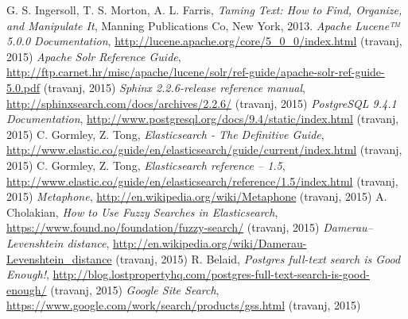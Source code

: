 \documentclass[a4paper,twoside,12pt]{scrreprt}
\begin{document}
\begin{thebibliography}{99}
   G. S. Ingersoll, T. S. Morton, A. L. Farris, \textit{Taming Text: How to Find, Organize, and Manipulate It}, Manning Publications Co, New York, 2013.
   \textit{Apache Lucene™ 5.0.0 Documentation}, \url{http://lucene.apache.org/core/5_0_0/index.html} (travanj, 2015)
   \textit{Apache Solr Reference Guide}, \url{http://ftp.carnet.hr/misc/apache/lucene/solr/ref-guide/apache-solr-ref-guide-5.0.pdf} (travanj, 2015)
   \textit{Sphinx 2.2.6-release reference manual}, \url{http://sphinxsearch.com/docs/archives/2.2.6/} (travanj, 2015)
   \textit{PostgreSQL 9.4.1 Documentation}, \url{http://www.postgresql.org/docs/9.4/static/index.html} (travanj, 2015)
   C. Gormley, Z. Tong, \textit{Elasticsearch - The Definitive Guide}, \url{http://www.elastic.co/guide/en/elasticsearch/guide/current/index.html} (travanj, 2015)
   C. Gormley, Z. Tong, \textit{Elasticsearch reference – 1.5}, \url{http://www.elastic.co/guide/en/elasticsearch/reference/1.5/index.html} (travanj, 2015)
   \textit{Metaphone}, \url{http://en.wikipedia.org/wiki/Metaphone} (travanj, 2015)
   A. Cholakian, \textit{How to Use Fuzzy Searches in Elasticsearch}, \url{https://www.found.no/foundation/fuzzy-search/} (travanj, 2015)
   \textit{Damerau–Levenshtein distance}, \url{http://en.wikipedia.org/wiki/Damerau-Levenshtein_distance} (travanj, 2015)
   R. Belaid, \textit{Postgres full-text search is Good Enough!}, \url{http://blog.lostpropertyhq.com/postgres-full-text-search-is-good-enough/} (travanj, 2015)
   \textit{Google Site Search}, \url{https://www.google.com/work/search/products/gss.html} (travanj, 2015)
\end{thebibliography}

\pagestyle{empty}
\end{document}
